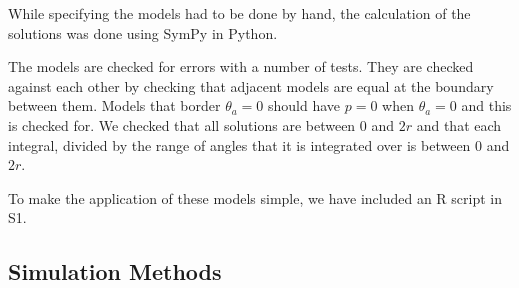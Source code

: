 \documentclass[a4paper,10pt,reqno,oneside]{amsart}
\begin{document}
While specifying the models had to be done by hand, the calculation of the solutions was done using SymPy \cite{sympy} in Python. 

The models are checked for errors with a number of tests. They are checked against each other by checking that adjacent models are equal at the boundary between them. Models that border $ \theta_a = 0$ should have $p = 0$ when $ \theta_a = 0$ and this is checked for. We checked that all solutions are between 0 and $2r$ and that each integral, divided by the range of angles that it is integrated over is between 0 and $2r$.

To make the application of these models simple, we have included an R script in S1. 

\subsection{Simulation Methods}
\end{document}
